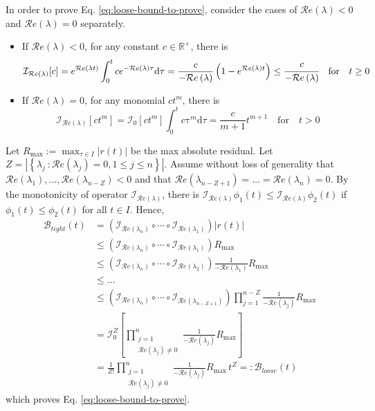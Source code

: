 \documentclass[]{uai2023}
\newcommand{\Bound}{\mathcal{B}}
\newcommand{\I}{\mathcal{I}}
\renewcommand{\Re}[1]{\mathcal{R}e\left(#1\right)}
\begin{document}
In order to prove Eq. \ref{eq:loose-bound-to-prove}, consider the cases of $\Re{\lambda} < 0$ and $\Re{\lambda} = 0$ separately.
\begin{itemize}
    \item If $\Re{\lambda} < 0$, for any constant $c\in \mathbb{R^{+}}$, there is \begin{equation} \I_{\Re{\lambda}} [c] = e^{\Re{\lambda t}} \int_{0}^{t} c e^{-\Re{\lambda}\tau} \mathrm{d}\tau = \frac{c}{-\Re{\lambda}} \left(1 - e^{\Re{\lambda} t}\right) \leq \cfrac{c}{-\Re{\lambda}}\quad \text{for} \quad t\geq0\end{equation}
    \item If $\Re{\lambda} = 0$, for any monomial $c t^{m}$, there is \begin{equation} \I_{\Re{\lambda }}[ct^m] = \I_{0}[ct^m] \int_{0}^{t} c\mathrm{\tau} ^m \mathrm{d}\tau = \frac{c}{m+1}t^{m+1} \quad\text{for}\quad t > 0 \end{equation}
\end{itemize}

Let $\displaystyle R_{\max} := \max_{\tau\in I} |r(t)|$ be the max absolute residual.
Let $Z = |\left\{\lambda_j\ :\Re{\lambda_j} =0,1 \leq j \leq n\right\}|$. 
Assume without loss of generality that $\Re{\lambda_1}, \dots, \Re{\lambda_{n-Z}} < 0$ and that $\Re{\lambda_{n-Z+1}} = \dots = \Re{\lambda_n} = 0$.
By the monotonicity of operator $\I_{\Re{\lambda}}$, there is $\I_{\Re{\lambda}} \phi_1(t) \leq \I_{\Re{\lambda}} \phi_2(t)$ if $\phi_1(t) \leq \phi_2(t)$ for all $t \in I$. Hence, 
\begin{align}
    \Bound_{tight}(t) &= \left(\I_{\Re{\lambda_n}}\circ \cdots \circ\I_{\Re{\lambda_{1}}}\right)\left|r(t)\right| \\
    &\leq \left(\I_{\Re{\lambda_n}}\circ \cdots \circ\I_{\Re{\lambda_{1}}}\right) R_{\max}\\
    &\leq \left(\I_{\Re{\lambda_n}}\circ \cdots \circ\I_{\Re{\lambda_{2}}}\right) \frac{1}{-\Re{\lambda_1}}R_{\max}\\
    &\leq \dots \nonumber \\
    &\leq \left(\I_{\Re{\lambda_n}}\circ \cdots \circ\I_{\Re{\lambda_{n-Z+1}}}\right) \prod_{j=1}^{n-Z}\frac{1}{-\Re{\lambda_j}}R_{\max}\\
    &= \I_0^Z \left[\prod_{\substack{j=1\\ \Re{\lambda_j}\neq 0}}^{n}\frac{1}{-\Re{\lambda_j}}R_{\max}\right]\\
    &= \frac{1}{Z!} \prod_{\substack{j=1\\ \Re{\lambda_j}\neq 0}}^{n}\frac{1}{-\Re{\lambda_j}}R_{\max}\, t^Z =: \Bound_{loose}(t)
\end{align}
which proves Eq. \ref{eq:loose-bound-to-prove}.
\end{document}
